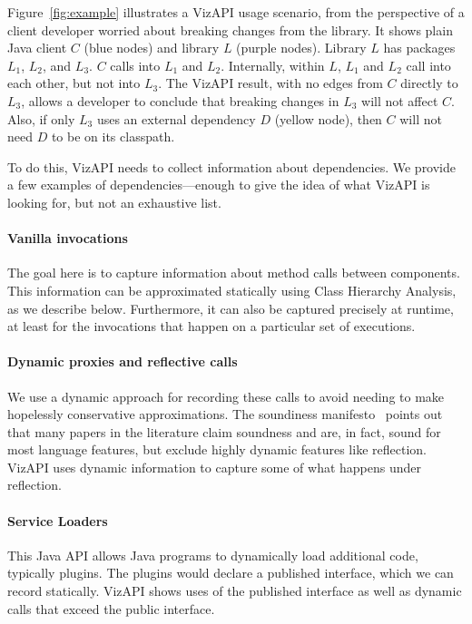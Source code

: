 Figure~\ref{fig:example} illustrates a VizAPI usage scenario, from the perspective of a client developer worried about breaking changes from the library. It shows plain Java client $C$ (blue nodes) and library $L$ (purple nodes). Library $L$ has packages $L_1$, $L_2$, and $L_3$. $C$ calls into $L_1$ and $L_2$. Internally, within $L$, $L_1$ and $L_2$ call into each other, but not into $L_3$. The VizAPI result, with no edges from $C$ directly to $L_3$, allows a developer to conclude that breaking changes in $L_3$ will not affect $C$. Also, if only $L_3$ uses an external dependency $D$ (yellow node), then $C$ will not need $D$ to be on its classpath.

To do this, VizAPI needs to collect information about dependencies. We provide a few examples of dependencies---enough to give the idea of what VizAPI is looking for, but not an exhaustive list.

\paragraph{Vanilla invocations} The goal here is to capture information about method calls between components. This information can be approximated statically using Class Hierarchy Analysis, as we describe below. Furthermore, it can also be captured precisely at runtime, at least for the invocations that happen on a particular set of executions.

\paragraph{Dynamic proxies and reflective calls} We use a dynamic approach for recording these calls to avoid needing to make hopelessly conservative approximations. The soundiness manifesto~\cite{livshits15:_in_defen_sound} points out that many papers in the literature claim soundness and are, in fact, sound for most language features, but exclude highly dynamic features like reflection. VizAPI uses dynamic information to capture some of what happens under reflection.

\paragraph{Service Loaders} This Java API allows Java programs to dynamically load additional code, typically plugins. The plugins would declare a published interface, which we can record statically. VizAPI shows uses of the published interface as well as dynamic calls that exceed the public interface.


